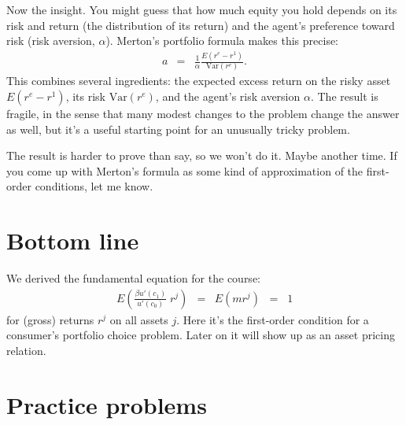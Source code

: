 \documentclass[11pt]{article}
\begin{document}
Now the insight.  You might guess that how much equity you hold
depends on its risk and return (the distribution of its return)
and the agent's preference toward risk (risk aversion, $\alpha$).
Merton's portfolio formula makes this precise:
\begin{eqnarray*}
    a &=& \frac{1}{\alpha} \frac{E (r^e - r^1)}{\mbox{Var}(r^e)} .
\end{eqnarray*}
This combines several ingredients:
the expected excess return on the risky asset $E (r^e - r^1)$,
its risk $\mbox{Var}(r^e)$,
and the agent's risk aversion $\alpha$.
The result is fragile, in the sense that many modest changes to the problem
change the answer as well,
but it's a useful starting point for an unusually tricky problem.

The result is harder to prove than say, so we won't do it.
Maybe another time.
If you come up with Merton's formula as some kind of approximation
of the first-order conditions, let me know.

\begin{comment}
Merton derived it in continuous time using a set of tools
we will diligently avoid.
Here we might start with the lognormal assumption.
Let us say that $x = \log r^e - \log r^1 \sim \mathcal{N}(\kappa_1,\kappa_2)$.
Then $r^e = r^1 e^x$ and
$r^e-r^1 = r^1 (e^x-1)$.
\end{comment}


\section*{Bottom line}

We derived the fundamental equation for the course:
\begin{eqnarray*}
    E \left( \frac{\beta u'(c_1)}{u'(c_0)}\; r^j \right) &=&
        E \left( m r^j \right) \;\;=\;\;  1
\end{eqnarray*}
for (gross) returns $r^j$ on all assets $j$.
Here it's the first-order condition for a consumer's portfolio choice
problem.
Later on it will show up as an asset pricing relation.


\section*{Practice problems}
\end{document}
